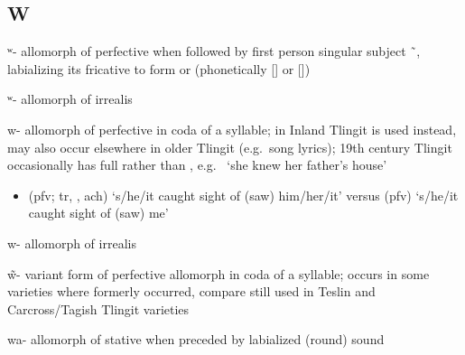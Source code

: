 \subsection{W}\label{sec:alphalist-w}
\begin{morphdesc}[resume*=alphalist]
\item[ʷ-]\label{m:ʷ-pfv}
	allomorph of perfective  when followed by
	first person singular subject  \~\ ,
	labializing its fricative to form  or 
	(phonetically [] or [])

\item[ʷ-]\label{m:ʷ-irr}
	allomorph of irrealis 

\item[w-]\label{m:w-pfv}
	allomorph of perfective  in coda of a syllable;
	in Inland Tlingit  is used instead, may also occur elsewhere in older Tlingit
		(e.g.\ song lyrics);
	19th century Tlingit occasionally has full  rather than ,
		e.g.\  ‘she knew her father’s house’
		\parencite[255.7]{swanton:1909}
	\begin{itemize}
	\item	{} (pfv; tr, , ach) ‘s/he/it caught sight of (saw) him/her/it’\newline
		versus  (pfv) ‘s/he/it caught sight of (saw) me’
	\end{itemize}

\item[w-]\label{m:w-irr}
	allomorph of irrealis 

\item[w̃-]\label{m:w̃-}
	variant form of perfective  allomorph in coda of a syllable;
	occurs in some varieties where  formerly occurred, compare  still used
	in Teslin and Carcross/Tagish Tlingit varieties

\item[wa-]\label{m:wa-}
	allomorph of stative  when preceded by labialized (round) sound


\end{morphdesc}
